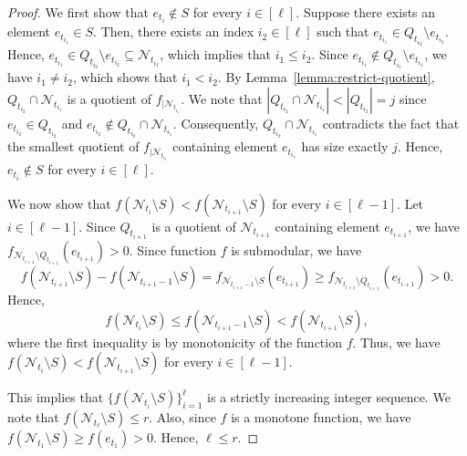 \documentclass[11pt]{article}
\theoremstyle{definition}
\begin{document}
\begin{proof}
    We first show that $e_{t_i}\not\in S$ for every $i\in [\ell]$. Suppose there exists an element $e_{t_{i_1}}\in S$. Then, there exists an index $i_2\in [\ell]$ such that $e_{t_{i_1}}\in Q_{t_{i_2}}\setminus e_{t_{i_2}}$. Hence, $e_{t_{i_1}}\in Q_{t_{i_2}}\setminus e_{t_{i_2}} \subseteq \mathcal{N}_{t_{i_2}}$, which implies that $i_1\leq i_2$. Since $e_{t_{i_1}}\not\in Q_{t_{i_1}}\setminus e_{t_{i_1}}$, we have $i_1 \neq i_2$, which shows that $i_1<i_2$. By Lemma~\ref{lemma:restrict-quotient}, $Q_{t_{i_2}}\cap \mathcal{N}_{t_{i_1}}$ is a quotient of $f_{|\mathcal{N}_{t_{i_1}}}$. We note that $|Q_{t_{i_2}}\cap \mathcal{N}_{t_{i_1}}|<|Q_{t_{i_2}}|=j$ since $e_{t_{i_2}}\in Q_{t_{i_2}}$ and $e_{t_{i_2}}\not\in Q_{t_{i_2}}\cap \mathcal{N}_{t_{i_1}}$. Consequently, $Q_{t_{i_2}}\cap \mathcal{N}_{t_{i_1}}$ contradicts the fact that the smallest quotient of $f_{|\mathcal{N}_{t_{i_1}}}$ containing element $e_{t_{i_1}}$ has size exactly $j$. Hence, $e_{t_i}\not\in S$ for every $i\in [\ell]$.

    We now show that $f(\mathcal{N}_{t_i}\setminus S)<f(\mathcal{N}_{t_{i+1}}\setminus S)$ for every $i\in [\ell-1]$. Let $i\in [\ell-1]$. Since $Q_{t_{i+1}}$ is a quotient of $\mathcal{N}_{t_{i+1}}$ containing element $e_{t_{i+1}}$, we have $f_{\mathcal{N}_{t_{i+1}}\setminus Q_{t_{i+1}}}(e_{t_{i+1}})>0$. Since function $f$ is submodular, we have
    $$f(\mathcal{N}_{t_{i+1}}\setminus S)-f(\mathcal{N}_{t_{i+1}-1}\setminus S) = f_{\mathcal{N}_{t_{i+1}-1}\setminus S}(e_{t_{i+1}}) \geq f_{\mathcal{N}_{t_{i+1}}\setminus Q_{t_{i+1}}}(e_{t_{i+1}})>0.$$
    Hence,
    $$f(\mathcal{N}_{t_i}\setminus S)\leq f(\mathcal{N}_{t_{i+1}-1}\setminus S)<f(\mathcal{N}_{t_{i+1}}\setminus S),$$
    where the first inequality is by monotonicity of the function $f$. Thus, we have $f(\mathcal{N}_{t_i}\setminus S)<f(\mathcal{N}_{t_{i+1}}\setminus S)$ for every $i\in [\ell-1]$.

    This implies that $\{f(\mathcal{N}_{t_i}\setminus S)\}_{i=1}^{\ell}$ is a strictly increasing integer sequence. We note that $f(\mathcal{N}_{t_\ell}\setminus S)\leq r$. Also, since $f$ is a monotone function, we have $f(\mathcal{N}_{t_1}\setminus S)\geq f(e_{t_1})>0$. Hence, $\ell\leq r$.
    
\end{proof}
\end{document}
